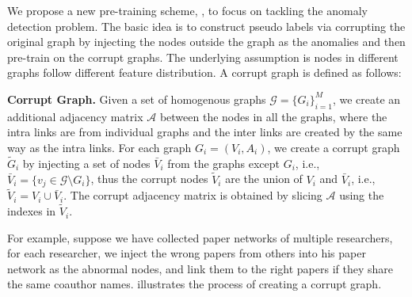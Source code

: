 {We propose a new pre-training scheme, \pmodel, to focus on tackling the anomaly detection problem. The basic idea is to construct pseudo labels via corrupting the original graph by injecting the nodes outside the graph as the anomalies and then pre-train \smodel on the corrupt graphs. The underlying assumption is nodes in different graphs follow  different feature distribution. A corrupt graph is defined as follows:

\begin{definition}
	\label{eq:corrupt_graph}
	\textbf{Corrupt Graph.} Given a set of homogenous graphs $\mathcal{G} = \{G_i\}_{i=1}^{M}$, we create an additional adjacency matrix $\mathcal{A}$ between the nodes in all the graphs, where the intra links are from individual graphs and the inter links are created by the same way as the intra links. For each graph $G_i=(V_i,A_i)$, we create a corrupt graph $\tilde{G}_i$ by injecting a set of nodes $\bar{V}_i $ from the graphs except $G_i$, i.e., $\bar{V}_i = \{v_j \in \mathcal{G} \setminus  G_i \}$, thus the corrupt nodes $\tilde{V}_i$ are the union of $V_i$ and $\bar{V}_i$, i.e., $\tilde{V}_i = V_i \cup \bar{V}_i$. The corrupt adjacency matrix is obtained by slicing $\mathcal{A}$ using the indexes in $\tilde{V}_i$. 
\end{definition}


For example, suppose we have collected paper networks of multiple researchers, for each researcher, we inject the wrong papers from others into his paper network as the abnormal nodes, and link them to the right papers if they share the same coauthor names.  illustrates the process of creating a corrupt graph. 

}
